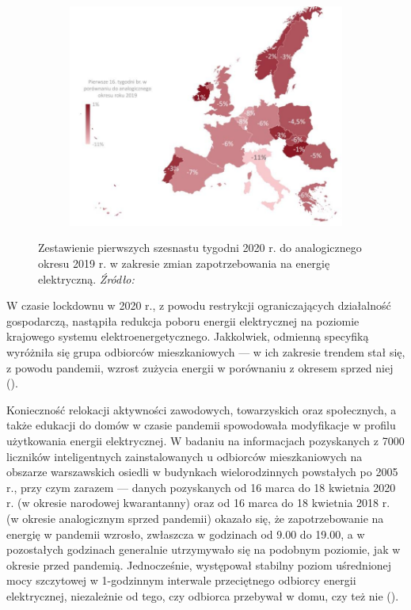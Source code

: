\documentclass[polish, twoside, 12pt, a4paper]{article}
\theoremstyle{definition}
\theoremstyle{plain}
\theoremstyle{remark}
\begin{document}
\begin{figure}[hbt]
  \centering

  \begin{subfigure}[t]{0.45\textwidth}
    \hspace{-1.8cm}
    \includegraphics[width=1.4\textwidth]{./out_figures/figure_6}
  \end{subfigure}

  \captionsetup{margin=10pt,font=small,labelfont=bf,width=.8\textwidth}

  \caption[Zmiany zapotrzebowania na energię elektryczną (16 tygodni)]{Zestawienie pierwszych szesnastu tygodni 2020 r. do analogicznego okresu 2019 r. w zakresie zmian zapotrzebowania na energię elektryczną. \textit{Źródło:} \cite{biuroanalizpfr2020}}\label{fig:x6}
\end{figure}

W czasie lockdownu w 2020 r., z powodu restrykcji ograniczających działalność gospodarczą, nastąpiła redukcja poboru energii elektrycznej na poziomie krajowego systemu elektroenergetycznego. Jakkolwiek, odmienną specyfiką wyróżniła się grupa odbiorców mieszkaniowych --- w ich zakresie trendem stał się, z powodu pandemii, wzrost zużycia energii w porównaniu z okresem sprzed niej (\cite{artsmart2023}). 

Konieczność relokacji aktywności zawodowych, towarzyskich oraz społecznych, a także edukacji do domów w czasie pandemii spowodowała modyfikacje w profilu użytkowania energii elektrycznej. W badaniu na informacjach pozyskanych z 7000 liczników inteligentnych zainstalowanych u odbiorców mieszkaniowych na obszarze warszawskich osiedli w budynkach wielorodzinnych powstałych po 2005 r., przy czym zarazem --- danych pozyskanych od 16 marca do 18 kwietnia 2020 r. (w okresie narodowej kwarantanny) oraz od 16 marca do 18 kwietnia 2018 r. (w okresie analogicznym sprzed pandemii) okazało się, że zapotrzebowanie na energię w pandemii wzrosło, zwłaszcza w godzinach od 9.00 do 19.00, a w pozostałych godzinach generalnie utrzymywało się na podobnym poziomie, jak w okresie przed pandemią. Jednocześnie, występował stabilny poziom uśrednionej mocy szczytowej w 1-godzinnym interwale przeciętnego odbiorcy energii elektrycznej, niezależnie od tego, czy odbiorca przebywał w domu, czy też nie (\cite{artsmart2023}). 
\end{document}
